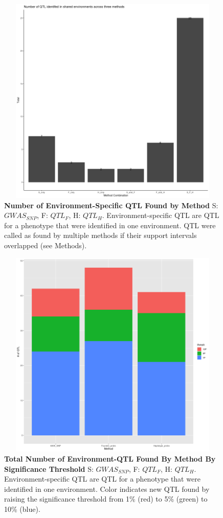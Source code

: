 \documentclass[9pt,twocolumn,twoside]{gsag3jnl}
\begin{document}
\begin{figure}[ht]
\centering
\includegraphics[width=16cm,height=10cm]{figures/environment_QTL_by_method.png}
\caption{\textbf{Number of Environment-Specific QTL Found by Method} S: $GWAS_{SNP}$, F: $QTL_F$, H: $QTL_H$. Environment-specific QTL are QTL for a phenotype that were identified in one environment. QTL were called as found by multiple methods if their support intervals overlapped (see Methods).}
\label{fig:supfigure2}
\end{figure}

\begin{figure}[ht]
\centering
\includegraphics[width=16cm,height=10cm]{figures/threshold_by_method_counts.png}
\caption{\textbf{Total Number of Environment-QTL Found By Method By Significance Threshold} S: $GWAS_{SNP}$, F: $QTL_F$, H: $QTL_H$. Environment-specific QTL are QTL for a phenotype that were identified in one environment. Color indicates new QTL found by raising the significance threshold from 1\% (red) to 5\% (green) to 10\% (blue).}
\label{fig:supfigure3}
\end{figure}
\end{document}
